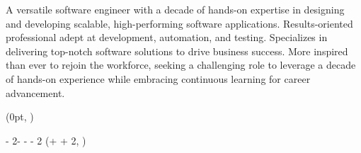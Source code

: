 \documentclass[11pt, a4paper]{resume}
\begin{document}
\makecvheader %

\begin{cvsummary}
    A versatile software engineer with a decade of hands-on expertise in designing and developing scalable, high-performing software applications. Results-oriented professional adept at development, automation, and testing. Specializes in delivering top-notch software solutions to drive business success. More inspired than ever to rejoin the workforce, seeking a challenging role to leverage a decade of hands-on experience while embracing continuous learning for career advancement.
\end{cvsummary}



\setlength{\headersmargin}{-0.2cm}
\setlength{\leftcolumnwidth}{5cm}
\setlength{\columnsmargin}{0.5\sidemargin}
\setlength{\timelinemargin}{0.5cm}


\begin{textblock*}{\leftcolumnwidth}(0pt, \headersmargin)
    \vspace{-2mm}
    
    \vspace{3mm}
    
    \vspace{3.5mm}
    
    
\end{textblock*}

\begin{textblock*}
    {\paperwidth - 2\sidemargin - \leftcolumnwidth - \columnsmargin - 2\timelinemargin}
    (\leftcolumnwidth + \columnsmargin + 2\timelinemargin, \headersmargin)
    \vspace{-2mm}
    
\end{textblock*}

\end{document}

